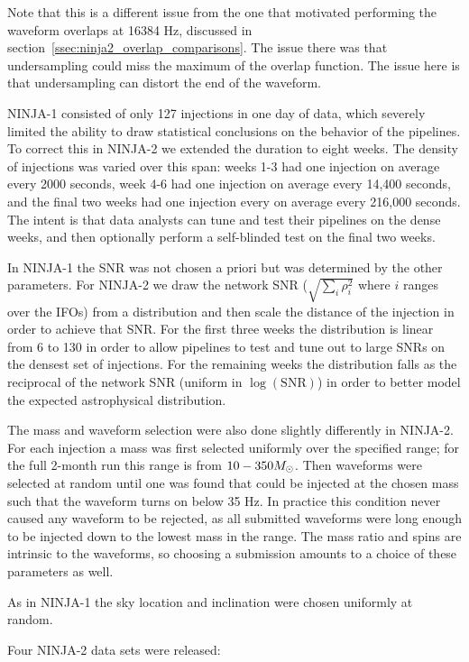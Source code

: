 Note that this is a different issue from the one that motivated
performing the waveform overlaps at 16384 Hz, discussed in
section~\ref{ssec:ninja2_overlap_comparisons}.  The issue there was
that undersampling could miss the maximum of the overlap function.
The issue here is that undersampling can distort the end of the
waveform.

NINJA-1 consisted of only 127 injections in one day of data, which
severely limited the ability to draw statistical conclusions on the
behavior of the pipelines.  To correct this in NINJA-2 we extended the
duration to eight weeks.  The density of injections was varied over
this span:  weeks 1-3 had one injection on average every 2000 seconds,
week 4-6 had one injection on average every 14,400 seconds, and the
final two weeks had one injection every on average every 216,000
seconds.  The intent is that data analysts can tune and test their
pipelines on the dense weeks, and then optionally perform a
self-blinded test on the final two weeks.

In NINJA-1 the SNR was not chosen a priori but was determined by the
other parameters.  For NINJA-2 we draw the network SNR ($\sqrt{\sum_i
\rho_i^2}$ where $i$ ranges over the IFOs) from a distribution and
then scale the distance of the injection in order to achieve that SNR.
For the first three weeks the distribution is linear from 6 to 130 in
order to allow pipelines to test and tune out to large SNRs on the
densest set of injections.  For the remaining weeks the distribution
falls as the reciprocal of the network SNR (uniform in
$\log(\mathrm{SNR})$) in order to better model the expected
astrophysical distribution.

The mass and waveform selection were also done slightly differently in
NINJA-2.  For each injection a mass was first selected uniformly over
the specified range; for the full 2-month run this range is from
$10-350 M_\odot$.  Then waveforms were selected at random until one was
found that could be injected at the chosen mass such that the waveform
turns on below 35 Hz.  In practice this condition never caused any
waveform to be rejected, as all submitted waveforms were long enough
to be injected down to the lowest mass in the range.  The mass ratio
and spins are intrinsic to the waveforms, so choosing a submission
amounts to a choice of these parameters as well. 

As in NINJA-1 the sky location and inclination were chosen uniformly
at random.

Four NINJA-2 data sets were released:

